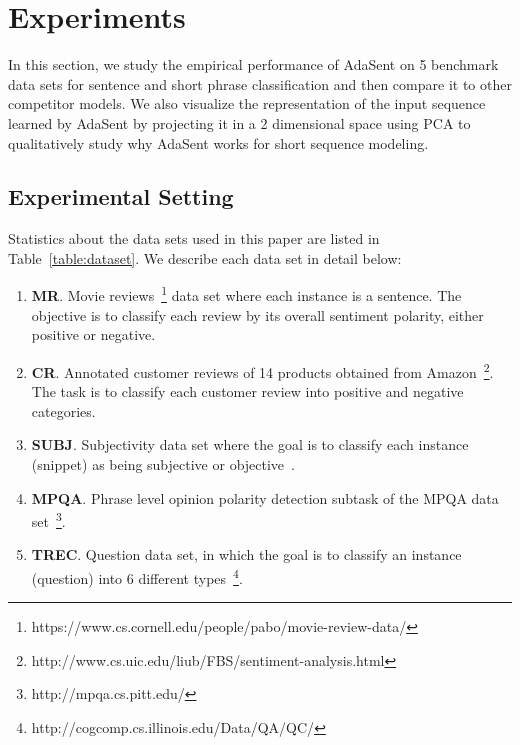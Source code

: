 \documentclass{article}
\theoremstyle{definition}
\begin{document}
\section{Experiments}
In this section, we study the empirical performance of AdaSent on 5 benchmark data sets for sentence and short phrase classification and then compare it to other competitor models. We also visualize the representation of the input sequence learned by AdaSent by projecting it in a 2 dimensional space using PCA to qualitatively study why AdaSent works for short sequence modeling. 
\label{sec:experiment}
\subsection{Experimental Setting}
Statistics about the data sets used in this paper are listed in Table~\ref{table:dataset}. We describe each data set in detail below:
\begin{enumerate}
	\item 	\textbf{MR}. Movie reviews~\cite{pang2005seeing}\footnote{https://www.cs.cornell.edu/people/pabo/movie-review-data/} data set where each instance is a sentence. The objective is to classify each review by its overall sentiment polarity, either positive or negative.
	\item 	\textbf{CR}. Annotated customer reviews of 14 products obtained from Amazon~\cite{hu2004mining}\footnote{http://www.cs.uic.edu/liub/FBS/sentiment-analysis.html}. The task is to classify each customer review into positive and negative categories.
	\item 	\textbf{SUBJ}. Subjectivity data set where the goal is to classify each instance (snippet) as being subjective or objective~\cite{pang2004sentimental}.
	\item 	\textbf{MPQA}. Phrase level opinion polarity detection subtask of the MPQA data set~\cite{wiebe2005annotating}\footnote{http://mpqa.cs.pitt.edu/}.
	\item 	\textbf{TREC}. Question data set, in which the goal is to classify an instance (question) into 6 different types~\cite{li2002learning}\footnote{http://cogcomp.cs.illinois.edu/Data/QA/QC/}.
\end{enumerate}
\end{document}
